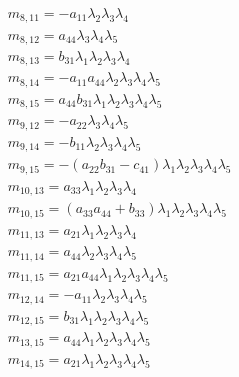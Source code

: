 \documentclass{article}
\begin{document}
\begin{align*}
&m_{8,11}=-a_{11} \lambda_{2} \lambda_{3} \lambda_{4}\\
&m_{8,12}=a_{44} \lambda_{3} \lambda_{4} \lambda_{5}\\
&m_{8,13}=b_{31} \lambda_{1} \lambda_{2} \lambda_{3} \lambda_{4}\\
&m_{8,14}=-a_{11} a_{44} \lambda_{2} \lambda_{3} \lambda_{4} \lambda_{5}\\
&m_{8,15}=a_{44} b_{31} \lambda_{1} \lambda_{2} \lambda_{3} \lambda_{4} \lambda_{5}\\
&m_{9,12}=-a_{22} \lambda_{3} \lambda_{4} \lambda_{5}\\
&m_{9,14}=-b_{11} \lambda_{2} \lambda_{3} \lambda_{4} \lambda_{5}\\
&m_{9,15}=-{\left(a_{22} b_{31} - c_{41}\right)} \lambda_{1} \lambda_{2} \lambda_{3} \lambda_{4} \lambda_{5}\\
&m_{10,13}=a_{33} \lambda_{1} \lambda_{2} \lambda_{3} \lambda_{4}\\
&m_{10,15}={\left(a_{33} a_{44} + b_{33}\right)} \lambda_{1} \lambda_{2} \lambda_{3} \lambda_{4} \lambda_{5}\\
&m_{11,13}=a_{21} \lambda_{1} \lambda_{2} \lambda_{3} \lambda_{4}\\
&m_{11,14}=a_{44} \lambda_{2} \lambda_{3} \lambda_{4} \lambda_{5}\\
&m_{11,15}=a_{21} a_{44} \lambda_{1} \lambda_{2} \lambda_{3} \lambda_{4} \lambda_{5}\\
&m_{12,14}=-a_{11} \lambda_{2} \lambda_{3} \lambda_{4} \lambda_{5}\\
&m_{12,15}=b_{31} \lambda_{1} \lambda_{2} \lambda_{3} \lambda_{4} \lambda_{5}\\
&m_{13,15}=a_{44} \lambda_{1} \lambda_{2} \lambda_{3} \lambda_{4} \lambda_{5}\\
&m_{14,15}=a_{21} \lambda_{1} \lambda_{2} \lambda_{3} \lambda_{4} \lambda_{5}\\
\end{align*}
\newpage
\end{document}
